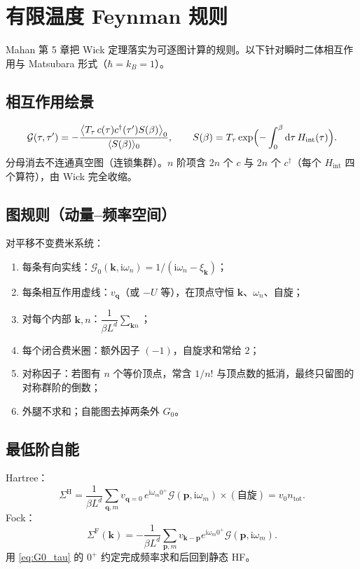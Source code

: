 \section{有限温度 Feynman 规则}

Mahan 第 5 章把 Wick 定理落实为可逐图计算的规则。以下针对瞬时二体相互作用与 Matsubara 形式（$\hbar=k_B=1$）。

\subsection{相互作用绘景}

\begin{equation}
  \mathcal{G}(\tau,\tau')
  =-\frac{
  \bigl\langle
  T_\tau\,
  c(\tau)c^\dagger(\tau')
  S(\beta)
  \bigr\rangle_0
  }{
  \langle S(\beta)\rangle_0
  },
  \qquad
  S(\beta)
  =T_\tau\exp\Bigl(
  -\int_0^\beta\mathrm{d}\tau\,H_{\mathrm{int}}(\tau)
  \Bigr).
\end{equation}
分母消去不连通真空图（连锁集群）。$n$ 阶项含 $2n$ 个 $c$ 与 $2n$ 个 $c^\dagger$（每个 $H_{\mathrm{int}}$ 四个算符），由 Wick 完全收缩。

\subsection{图规则（动量--频率空间）}

对平移不变费米系统：
\begin{enumerate}
  \item 每条有向实线：$\mathcal{G}_0(\mathbf{k},\mathrm{i}\omega_n)=1/(\mathrm{i}\omega_n-\xi_{\mathbf{k}})$；
  \item 每条相互作用虚线：$v_{\mathbf{q}}$（或 $-U$ 等），在顶点守恒 $\mathbf{k}$、$\omega_n$、自旋；
  \item 对每个内部 $\mathbf{k},n$：$\dfrac{1}{\beta L^d}\sum_{\mathbf{k}n}$；
  \item 每个闭合费米圈：额外因子 $(-1)$，自旋求和常给 $2$；
  \item 对称因子：若图有 $n$ 个等价顶点，常含 $1/n!$ 与顶点数的抵消，最终只留图的对称群阶的倒数；
  \item 外腿不求和；自能图去掉两条外 $G_0$。
\end{enumerate}

\subsection{最低阶自能}

Hartree：
\begin{equation}
  \Sigma^{\mathrm{H}}
  =\frac{1}{\beta L^d}\sum_{\mathbf{q},m}
  v_{\mathbf{q}=0}\,
  e^{\mathrm{i}\omega_m 0^+}
  \mathcal{G}(\mathbf{p},\mathrm{i}\omega_m)
  \times(\text{自旋})
  =v_0 n_{\mathrm{tot}}.
\end{equation}
Fock：
\begin{equation}
  \Sigma^{\mathrm{F}}(\mathbf{k})
  =-\frac{1}{\beta L^d}\sum_{\mathbf{p},m}
  v_{\mathbf{k}-\mathbf{p}}
  e^{\mathrm{i}\omega_m 0^+}
  \mathcal{G}(\mathbf{p},\mathrm{i}\omega_m).
\end{equation}
用 \eqref{eq:G0_tau} 的 $0^+$ 约定完成频率求和后回到静态 HF。

